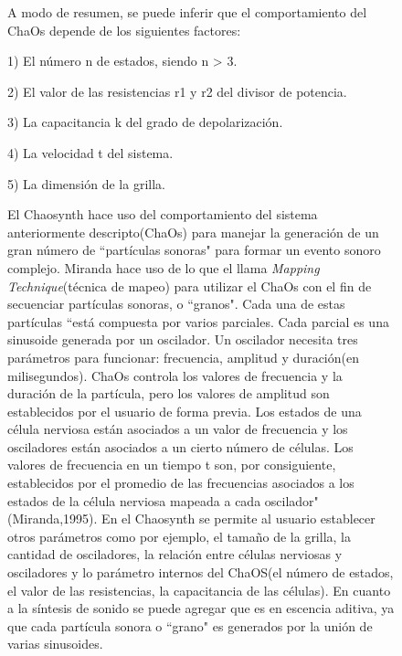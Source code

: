 \documentclass[16pt,spanish]{article}
\begin{document}
\begin{figure}[h!]
A modo de resumen, se puede inferir que el comportamiento del ChaOs depende de los siguientes factores:

1) El número n de estados, siendo n > 3.

2) El valor de las resistencias r1 y r2 del divisor de potencia.

3) La capacitancia k del grado de depolarización.

4) La velocidad t del sistema.

5) La dimensión de la grilla.


El Chaosynth hace uso del comportamiento del sistema anteriormente descripto(ChaOs) para manejar la generación de un gran número de ``partículas sonoras" para formar un evento sonoro complejo. Miranda hace uso de lo que el llama \textit{Mapping Technique}(técnica de mapeo) para utilizar el ChaOs con el fin de secuenciar partículas sonoras, o ``granos". Cada una de estas partículas  ``está compuesta por varios parciales. Cada parcial es una sinusoide generada por un oscilador. Un oscilador necesita tres parámetros para funcionar: frecuencia, amplitud y duración(en milisegundos). ChaOs controla los valores de frecuencia y la duración de la partícula, pero los valores de amplitud son establecidos por el usuario de forma previa. Los estados de una célula nerviosa están asociados a un valor de frecuencia y los osciladores están asociados a un cierto número de células. Los valores de frecuencia en un tiempo t son, por consiguiente, establecidos por el promedio de las frecuencias asociados a los estados de la célula nerviosa mapeada a cada oscilador"(Miranda,1995). En el Chaosynth se permite al usuario establecer otros parámetros como por ejemplo, el tamaño de la grilla, la cantidad de osciladores, la relación entre células nerviosas y osciladores y lo parámetro internos del ChaOS(el número de estados, el valor de las resistencias, la capacitancia de las células). En cuanto a la síntesis de sonido se puede agregar que es en escencia aditiva, ya que cada partícula sonora o ``grano" es generados por la unión de varias sinusoides.



\end{figure}
\end{document}
